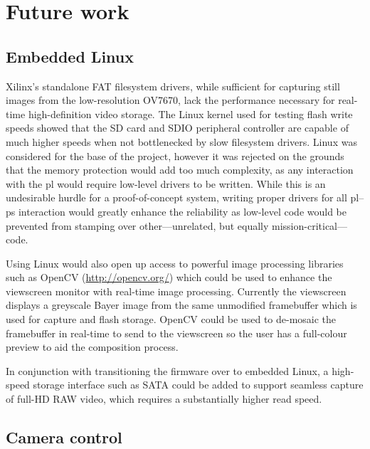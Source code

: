 \section{Future work}

\subsection{Embedded Linux}

Xilinx's standalone FAT filesystem drivers, while sufficient for capturing still images from the low-resolution OV7670, lack the performance necessary for real-time high-definition video storage. The Linux kernel used for testing flash write speeds showed that the SD card and SDIO peripheral controller are capable of much higher speeds when not bottlenecked by slow filesystem drivers. Linux was considered for the base of the project, however it was rejected on the grounds that the memory protection would add too much complexity, as any interaction with the \gls{pl} would require low-level drivers to be written. While this is an undesirable hurdle for a proof-of-concept system, writing proper drivers for all \gls{pl}--\gls{ps} interaction would greatly enhance the reliability as low-level code would be prevented from stamping over other---unrelated, but equally mission-critical---code.

Using Linux would also open up access to powerful image processing libraries such as OpenCV (\url{http://opencv.org/}) which could be used to enhance the viewscreen monitor with real-time image processing. Currently the viewscreen displays a greyscale Bayer image from the same unmodified framebuffer which is used for capture and flash storage. OpenCV could be used to de-mosaic the framebuffer in real-time to send to the viewscreen so the user has a full-colour preview to aid the composition process.

In conjunction with transitioning the firmware over to embedded Linux, a high-speed storage interface such as SATA could be added to support seamless capture of full-HD RAW video, which requires a substantially higher read speed. 

\subsection{Camera control}

